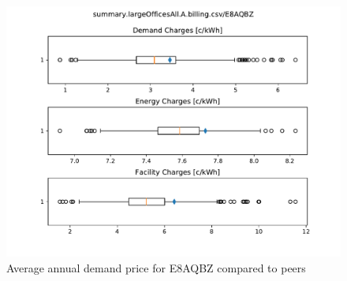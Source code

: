 \documentclass[11pt]{article}
\begin{document}
\lipsum[1][1-7]

\begin{figure}[!h]
\centering
\includegraphics[width=\columnwidth, page=1, trim=0in 3.8in 0in 0.5in, clip]{visuals/E8AQBZ.whiskerchart.pdf}
\caption{Average annual demand price for E8AQBZ compared to peers}
\label{fig:PeerCompDmnd}
\end{figure}
\end{document}
